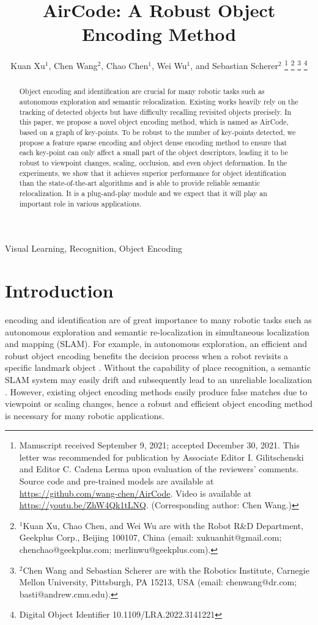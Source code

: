 \documentclass[letterpaper, 10 pt, journal, twoside]{IEEEtran}  %
\title{\LARGE \bf AirCode: A Robust Object Encoding Method}
\author{Kuan Xu$^{1}$, Chen Wang$^{2}$, Chao Chen$^{1}$, Wei Wu$^{1}$, and Sebastian Scherer$^{2}$%
\thanks{Manuscript received September 9, 2021; accepted December 30, 2021. This letter was recommended for publication by Associate Editor I. Gilitschenski and Editor C. Cadena Lerma upon evaluation of the reviewers' comments. Source code and pre-trained models are available at \url{https://github.com/wang-chen/AirCode}. Video is available at \url{https://youtu.be/ZhW4Qk1tLNQ}. (Corresponding author: Chen Wang.)}%
\thanks{$^{1}$Kuan Xu, Chao Chen, and Wei Wu are with the Robot R\&D Department, Geekplus Corp., Beijing 100107, China (email: xukuanhit@gmail.com; chenchao@geekplus.com; merlinwu@geekplus.com).}%
\thanks{$^{2}$Chen Wang and Sebastian Scherer are with the Robotics Institute, Carnegie Mellon University, Pittsburgh, PA 15213, USA (email: chenwang@dr.com; basti@andrew.cmu.edu).}%
\thanks{Digital Object Identifier 10.1109/LRA.2022.3141221}
}
\newcommand{\fix}[1]{#1}
\begin{document}
\maketitle


\begin{abstract}
Object encoding and identification are crucial for many robotic tasks such as autonomous exploration and semantic relocalization. Existing works heavily rely on the tracking of detected objects but have difficulty recalling revisited objects precisely. In this paper, we propose a novel object encoding method, which is named as AirCode, based on a graph of key-points. To be robust to the number of key-points detected, we propose a feature sparse encoding and object dense encoding method to ensure that each key-point can only affect a small part of the object descriptors, leading it to be robust to viewpoint changes, scaling, occlusion, and even object deformation. In the experiments, we show that it achieves superior performance for object identification than the state-of-the-art algorithms and is able to provide reliable semantic relocalization. It is a plug-and-play module and we expect that it will play an important role in various applications.
\end{abstract}


\begin{IEEEkeywords}
Visual Learning, Recognition, Object Encoding
\end{IEEEkeywords}

\section{Introduction}

 encoding and identification are of great importance to many robotic tasks such as autonomous exploration and semantic re-localization in simultaneous localization and mapping (SLAM).
For example, in autonomous exploration, an efficient and robust object encoding benefits the decision process when a robot revisits a specific landmark object \cite{wang2020visual,wang2021unsupervised}.
Without the capability of \fix{place recognition}, a semantic SLAM system may easily drift and subsequently lead to an unreliable localization \cite{wang2020online}.
However, existing object encoding methods easily produce false matches due to viewpoint or scaling changes, hence a robust and efficient object encoding method is necessary for many robotic applications.
\end{document}
